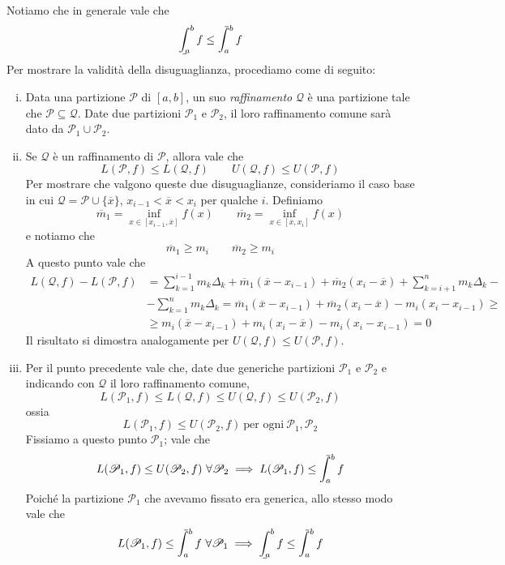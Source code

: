\begin{remark}
    Notiamo che in generale vale che
    \[
    \bint_a^b f \le \aint_a^b f
    \]
    Per mostrare la validità della disuguaglianza, procediamo come di seguito:
    \begin{enumerate}[(i)]
        \item Data una partizione $\mathscr{P}$ di $[a,b]$, un suo \emph{raffinamento} $\mathscr{Q}$ è una partizione tale che $\mathscr{P}\subseteq \mathscr{Q}$. Date due partizioni $\mathscr{P}_1$ e $\mathscr{P}_2$, il loro raffinamento comune sarà dato da $\mathscr{P}_1 \cup \mathscr{P}_2$.
        \item Se $\mathscr{Q}$ è un raffinamento di $\mathscr{P}$, allora vale che
        \[
        L(\mathscr{P}, f) \le L(\mathscr{Q},f) \qquad U(\mathscr{Q},f)\le U(\mathscr{P},f)
        \]
        Per mostrare che valgono queste due disuguaglianze, consideriamo il caso base in cui $\mathscr{Q} = \mathscr{P} \cup \{\overline{x}\}$, $x_{i-1} < \overline{x}<x_i$ per qualche $i$. Definiamo
        \[
        \overline{m}_1 = \inf_{x\in[x_{i-1}, \overline{x}]}f(x) \qquad \overline{m}_2 = \inf_{x\in[\overline{x}, x_i]}f(x)
        \]
        e notiamo che
        \[
        \overline{m}_1 \ge m_i \qquad \overline{m}_2 \ge m_i
        \]
        A questo punto vale che
        \[
        \begin{split}
            L(\mathscr{Q}, f)-L(\mathscr{P},f) &= \sum_{k=1}^{i-1}m_k \Delta_k + \overline{m}_1 (\overline{x}-x_{i-1}) + \overline{m}_2 (x_i - \overline{x}) + \sum_{k=i+1}^n m_k \Delta_k - \\
            & -\sum_{k=1}^n m_k \Delta_k = \overline{m}_1 (\overline{x}-x_{i-1}) + \overline{m}_2 (x_i - \overline{x})-m_i(x_{i}-x_{i-1})\ge \\
            & \ge m_i(\overline{x}-x_{i-1}) + m_i (x_i -\overline{x})-m_i(x_i-x_{i-1}) = 0
        \end{split}
        \]
        Il risultato si dimostra analogamente per $U(\mathscr{Q}, f) \le U(\mathscr{P},f)$.
        \item Per il punto precedente vale che, date due generiche partizioni $\mathscr{P}_1$ e $\mathscr{P_2}$ e indicando con $\mathscr{Q}$ il loro raffinamento comune,
        \[
        L(\mathscr{P}_1, f)\le L(\mathscr{Q}, f) \le U(\mathscr{Q}, f)\le U(\mathscr{P_2}, f)
        \]
        ossia
       \begin{equation}
           \label{eq:8.5}
           L(\mathscr{P}_1, f)\le U(\mathscr{P}_2, f) \ \text{per ogni} \ \mathscr{P}_1, \mathscr{P}_2
       \end{equation}
       Fissiamo a questo punto $\mathscr{P}_1$; vale che
       \[
       L(\mathscr{P}_1, f)\le U(\mathscr{P}_2, f) \ \forall \mathscr{P}_2 \implies L(\mathscr{P}_1, f)\le \aint_a^b f
       \]
       Poiché la partizione $\mathscr{P}_1$ che avevamo fissato era generica, allo stesso modo vale che
       \[
       L(\mathscr{P}_1, f)\le \aint_a^b f \ \forall \mathscr{P}_1 \implies \bint_a^b f \le \aint_a^b f
       \]
    \end{enumerate}
\end{remark}
